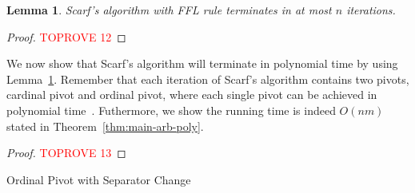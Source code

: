 \documentclass[11pt]{article}
\newtheorem{lemma}[theorem]{Lemma}
\begin{document}
        

























\begin{lemma}\label{lem:Scarf-Linear-Time}
    Scarf's algorithm with FFL rule terminates in at most $n$ iterations.
\end{lemma}

\begin{proof}\textcolor{red}{TOPROVE 12}\end{proof}



We now show that Scarf's algorithm will terminate in polynomial time by using Lemma~\ref{lem:Scarf-Linear-Time}. Remember that each iteration of Scarf's algorithm contains two pivots, cardinal pivot and ordinal pivot, where each single pivot can be achieved in polynomial time~\cite{scarf1967core}. Futhermore, we show the running time is indeed $O(nm)$ stated in Theorem~\ref{thm:main-arb-poly}.
\begin{proof}\textcolor{red}{TOPROVE 13}\end{proof}

\begin{algorithm}
\caption{Ordinal Pivot with Separator Change}\label{alg:op-arb}
\begin{algorithmic}
\Else
{}
\EndIf
\end{algorithmic}
\end{algorithm}
\end{document}
